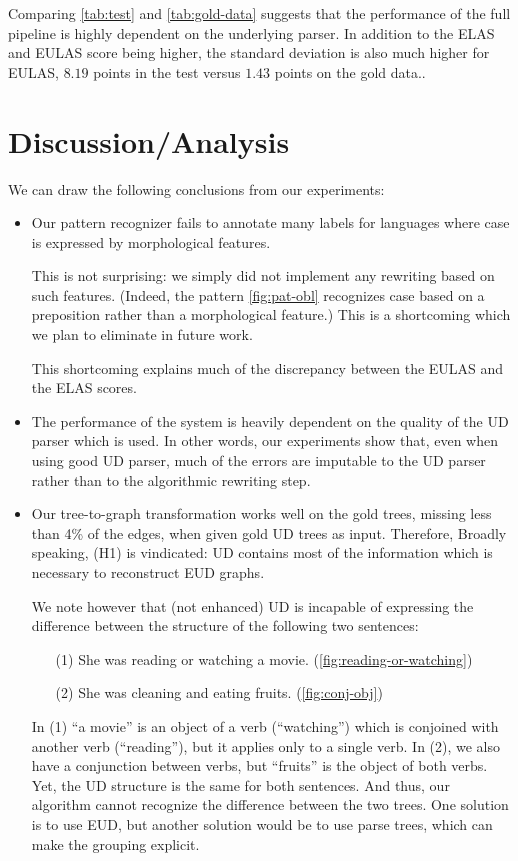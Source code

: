 \documentclass[11pt,a4paper]{article}
\begin{document}
Comparing \cref{tab:test} and \cref{tab:gold-data} suggests that the
performance of the full pipeline is highly dependent on the underlying
parser. In addition to the ELAS and EULAS score being higher, the
standard deviation is also much higher for EULAS, $8.19$ points in the
test versus $1.43$ points on the gold data..

\section{Discussion/Analysis}

We can draw the following conclusions from our experiments:

\begin{itemize}
\item
  Our pattern recognizer fails to annotate many labels
  for languages where case is expressed by morphological features.
  
  This is not surprising: we simply did not implement any rewriting
  based on such features. (Indeed, the pattern \cref{fig:pat-obl}
  recognizes case based on a preposition rather than a morphological
  feature.) This is a shortcoming which we plan to eliminate in future
  work.

  This shortcoming explains much of the discrepancy between the EULAS
  and the ELAS scores.
  
\item The performance of the system is heavily dependent on the
  quality of the UD parser which is used. In other words, our
  experiments show that, even when using good UD parser, much of the
  errors are imputable to the UD parser rather than to the algorithmic
  rewriting step.

\item Our tree-to-graph transformation works well on the gold trees,
  missing less than 4\% of the edges, when given gold UD trees as input.
  Therefore, Broadly speaking, (H1) is vindicated: UD contains most of
  the information which is necessary to reconstruct EUD graphs.

  We note however that (not enhanced) UD is incapable of expressing
  the difference between the structure of the following two sentences:
  
  \begin{itemize}
    \item[(1)] She was reading or watching a movie. (\cref{fig:reading-or-watching})
    \item[(2)] She was cleaning and eating fruits. (\cref{fig:conj-obj})
  \end{itemize}
  In (1) ``a movie'' is an object of a verb (``watching'') which
  is conjoined with another verb (``reading''), but it applies only
  to a single verb. In (2), we also have a conjunction between
  verbs, but ``fruits'' is the object of both verbs. Yet, the UD
  structure is the same for both sentences. And thus, our algorithm
  cannot recognize the difference between the two trees.  One
  solution is to use EUD, but another solution would be to use
  parse trees, which can make the grouping explicit.


\end{itemize}
\end{document}
